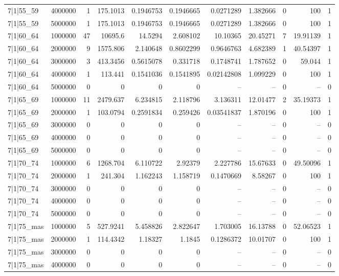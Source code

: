 \begin{tabular}{lrrrrrrrrrr}
7|1|55\_59 & 4000000 & 1 & 175.1013 & 0.1946753 & 0.1946665 & 0.0271289 & 1.382666 & 0 & 100 & 1 \\
7|1|55\_59 & 5000000 & 1 & 175.1013 & 0.1946753 & 0.1946665 & 0.0271289 & 1.382666 & 0 & 100 & 1 \\
7|1|60\_64 & 1000000 & 47 & 10695.6 & 14.5294 & 2.608102 & 10.10365 & 20.45271 & 7 & 19.91139 & 1 \\
7|1|60\_64 & 2000000 & 9 & 1575.806 & 2.140648 & 0.8602299 & 0.9646763 & 4.682389 & 1 & 40.54397 & 1 \\
7|1|60\_64 & 3000000 & 3 & 413.3456 & 0.5615078 & 0.331718 & 0.1748741 & 1.787652 & 0 & 59.044 & 1 \\
7|1|60\_64 & 4000000 & 1 & 113.441 & 0.1541036 & 0.1541895 & 0.02142808 & 1.099229 & 0 & 100 & 1 \\
7|1|60\_64 & 5000000 & 0 & 0 & 0 & 0 & -- & -- & 0 & -- & 0 \\
7|1|65\_69 & 1000000 & 11 & 2479.637 & 6.234815 & 2.118796 & 3.136311 & 12.01477 & 2 & 35.19373 & 1 \\
7|1|65\_69 & 2000000 & 1 & 103.0794 & 0.2591834 & 0.259426 & 0.03541837 & 1.870196 & 0 & 100 & 1 \\
7|1|65\_69 & 3000000 & 0 & 0 & 0 & 0 & -- & -- & 0 & -- & 0 \\
7|1|65\_69 & 4000000 & 0 & 0 & 0 & 0 & -- & -- & 0 & -- & 0 \\
7|1|65\_69 & 5000000 & 0 & 0 & 0 & 0 & -- & -- & 0 & -- & 0 \\
7|1|70\_74 & 1000000 & 6 & 1268.704 & 6.110722 & 2.92379 & 2.227786 & 15.67633 & 0 & 49.50096 & 1 \\
7|1|70\_74 & 2000000 & 1 & 241.304 & 1.162243 & 1.158719 & 0.1470669 & 8.58267 & 0 & 100 & 1 \\
7|1|70\_74 & 3000000 & 0 & 0 & 0 & 0 & -- & -- & 0 & -- & 0 \\
7|1|70\_74 & 4000000 & 0 & 0 & 0 & 0 & -- & -- & 0 & -- & 0 \\
7|1|70\_74 & 5000000 & 0 & 0 & 0 & 0 & -- & -- & 0 & -- & 0 \\
7|1|75\_mas & 1000000 & 5 & 527.9241 & 5.458826 & 2.822647 & 1.703005 & 16.13788 & 0 & 52.06523 & 1 \\
7|1|75\_mas & 2000000 & 1 & 114.4342 & 1.18327 & 1.1845 & 0.1286372 & 10.01707 & 0 & 100 & 1 \\
7|1|75\_mas & 3000000 & 0 & 0 & 0 & 0 & -- & -- & 0 & -- & 0 \\
7|1|75\_mas & 4000000 & 0 & 0 & 0 & 0 & -- & -- & 0 & -- & 0 \\

\end{tabular}
